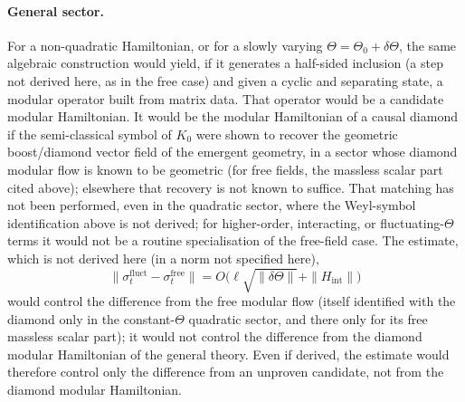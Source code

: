 \paragraph{General sector.}
For a non-quadratic Hamiltonian, or for a slowly varying
\(\Theta=\Theta_0+\delta\Theta\), the same algebraic construction would
yield, if it generates a half-sided inclusion (a step not derived here,
as in the free case) and given a cyclic and separating state, a
modular operator built from matrix data. That operator would be a
candidate modular Hamiltonian. It would be the modular Hamiltonian of
a causal diamond if the semi-classical symbol of \(K_0\) were shown to
recover the geometric boost/diamond vector field of the emergent
geometry, in a sector whose diamond modular flow is known to be
geometric (for free fields, the massless scalar part cited above);
elsewhere that recovery is not known to suffice. That matching has
not been performed, even in the quadratic sector, where the Weyl-symbol
identification above is not derived; for higher-order, interacting, or
fluctuating-\(\Theta\) terms it would not be a routine specialisation of
the free-field case. The
estimate, which is not derived here (in a norm not specified here),
\[
\|\sigma_t^{\mathrm{fluct}}-\sigma_t^{\mathrm{free}}\|
=O\bigl(\ell\sqrt{\|\delta\Theta\|}+\|H_{\mathrm{int}}\|\bigr)
\]
would control the difference from the free modular flow (itself
identified with the diamond only in the constant-\(\Theta\) quadratic
sector, and there only for its free massless scalar part); it would
not control the difference from the diamond modular Hamiltonian
of the general theory. Even if derived, the estimate would therefore
control only the difference from an unproven candidate, not from the
diamond modular
Hamiltonian.


